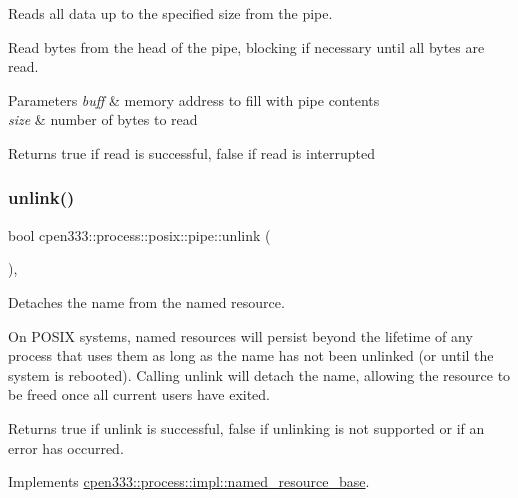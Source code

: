 Reads all data up to the specified size from the pipe. 

Read bytes from the head of the pipe, blocking if necessary until all bytes are read.


\begin{DoxyParams}{Parameters}
{\em buff} & memory address to fill with pipe contents \\
\hline
{\em size} & number of bytes to read \\
\hline
\end{DoxyParams}
\begin{DoxyReturn}{Returns}
true if read is successful, false if read is interrupted 
\end{DoxyReturn}
\mbox{\label{classcpen333_1_1process_1_1posix_1_1pipe_ac1dd8e1a7fd46480b709e96190afe697}} 
\subsubsection{\texorpdfstring{unlink()}{unlink()}\hspace{0.1cm}{\footnotesize\ttfamily [1/2]}}
{\footnotesize\ttfamily bool cpen333\+::process\+::posix\+::pipe\+::unlink (\begin{DoxyParamCaption}{ }\end{DoxyParamCaption})\hspace{0.3cm}{\ttfamily [inline]}, {\ttfamily [virtual]}}



Detaches the name from the named resource. 

On P\+O\+S\+IX systems, named resources will persist beyond the lifetime of any process that uses them as long as the name has not been unlinked (or until the system is rebooted). Calling {\ttfamily unlink} will detach the name, allowing the resource to be freed once all current users have exited.

\begin{DoxyReturn}{Returns}
{\ttfamily true} if unlink is successful, {\ttfamily false} if unlinking is not supported or if an error has occurred. 
\end{DoxyReturn}


Implements \hyperlink{classcpen333_1_1process_1_1impl_1_1named__resource__base_ae4033f82dfd068b917a9bca57d3a0c45}{cpen333\+::process\+::impl\+::named\+\_\+resource\+\_\+base}.

